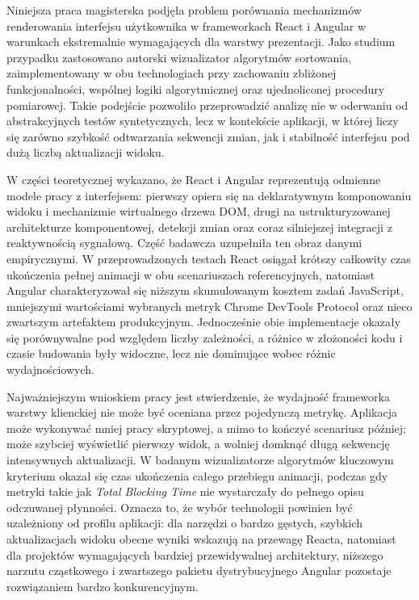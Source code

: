 \documentclass[12pt,openright,twoside]{report}
\begin{document}
Niniejsza praca magisterska podjęła problem porównania mechanizmów renderowania interfejsu użytkownika w frameworkach React i Angular w warunkach ekstremalnie wymagających dla warstwy prezentacji. Jako studium przypadku zastosowano autorski wizualizator algorytmów sortowania, zaimplementowany w obu technologiach przy zachowaniu zbliżonej funkcjonalności, wspólnej logiki algorytmicznej oraz ujednoliconej procedury pomiarowej. Takie podejście pozwoliło przeprowadzić analizę nie w oderwaniu od abstrakcyjnych testów syntetycznych, lecz w kontekście aplikacji, w której liczy się zarówno szybkość odtwarzania sekwencji zmian, jak i stabilność interfejsu pod dużą liczbą aktualizacji widoku.

W części teoretycznej wykazano, że React i Angular reprezentują odmienne modele pracy z interfejsem: pierwszy opiera się na deklaratywnym komponowaniu widoku i mechanizmie wirtualnego drzewa DOM, drugi na ustrukturyzowanej architekturze komponentowej, detekcji zmian oraz coraz silniejszej integracji z reaktywnością sygnałową. Część badawcza uzupełniła ten obraz danymi empirycznymi. W przeprowadzonych testach React osiągał krótszy całkowity czas ukończenia pełnej animacji w obu scenariuszach referencyjnych, natomiast Angular charakteryzował się niższym skumulowanym kosztem zadań JavaScript, mniejszymi wartościami wybranych metryk Chrome DevTools Protocol oraz nieco zwartszym artefaktem produkcyjnym. Jednocześnie obie implementacje okazały się porównywalne pod względem liczby zależności, a różnice w złożoności kodu i czasie budowania były widoczne, lecz nie dominujące wobec różnic wydajnościowych.

Najważniejszym wnioskiem pracy jest stwierdzenie, że wydajność frameworka warstwy klienckiej nie może być oceniana przez pojedynczą metrykę. Aplikacja może wykonywać mniej pracy skryptowej, a mimo to kończyć scenariusz później; może szybciej wyświetlić pierwszy widok, a wolniej domknąć długą sekwencję intensywnych aktualizacji. W badanym wizualizatorze algorytmów kluczowym kryterium okazał się czas ukończenia całego przebiegu animacji, podczas gdy metryki takie jak \textit{Total Blocking Time} nie wystarczały do pełnego opisu odczuwanej płynności. Oznacza to, że wybór technologii powinien być uzależniony od profilu aplikacji: dla narzędzi o bardzo gęstych, szybkich aktualizacjach widoku obecne wyniki wskazują na przewagę Reacta, natomiast dla projektów wymagających bardziej przewidywalnej architektury, niższego narzutu cząstkowego i zwartszego pakietu dystrybucyjnego Angular pozostaje rozwiązaniem bardzo konkurencyjnym.
\end{document}
